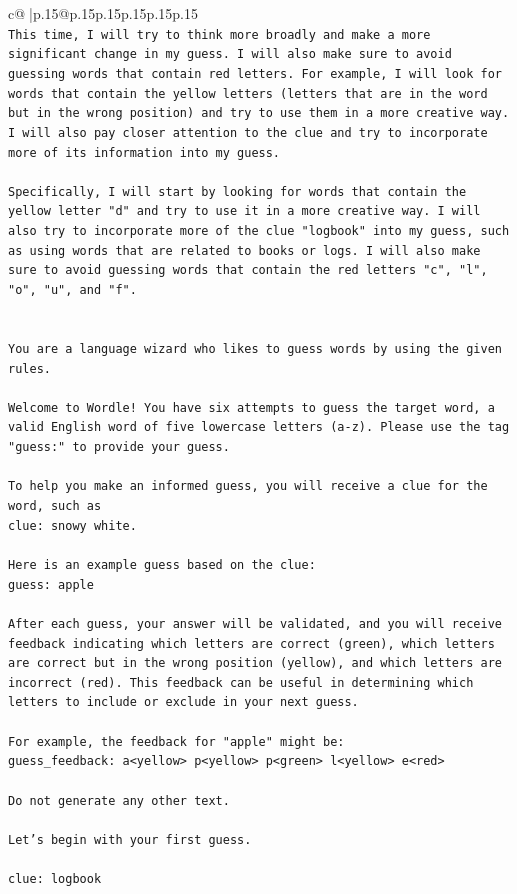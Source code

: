 \documentclass{article}
\begin{document}
{\begin{supertabular}{c@{$\;$}|p{.15\linewidth}@{}p{.15\linewidth}p{.15\linewidth}p{.15\linewidth}p{.15\linewidth}p{.15\linewidth}}
{{{\\ 
\texttt{This time, I will try to think more broadly and make a more significant change in my guess. I will also make sure to avoid guessing words that contain red letters. For example, I will look for words that contain the yellow letters (letters that are in the word but in the wrong position) and try to use them in a more creative way. I will also pay closer attention to the clue and try to incorporate more of its information into my guess.} \\
\\ 
\texttt{Specifically, I will start by looking for words that contain the yellow letter "d" and try to use it in a more creative way. I will also try to incorporate more of the clue "logbook" into my guess, such as using words that are related to books or logs. I will also make sure to avoid guessing words that contain the red letters "c", "l", "o", "u", and "f".} \\
\\ 
\\ 
\texttt{You are a language wizard who likes to guess words by using the given rules.} \\
\\ 
\texttt{Welcome to Wordle! You have six attempts to guess the target word, a valid English word of five lowercase letters (a{-}z). Please use the tag "guess:" to provide your guess.} \\
\\ 
\texttt{To help you make an informed guess, you will receive a clue for the word, such as} \\
\texttt{clue: snowy white.} \\
\\ 
\texttt{Here is an example guess based on the clue: } \\
\texttt{guess: apple} \\
\\ 
\texttt{After each guess, your answer will be validated, and you will receive feedback indicating which letters are correct (green), which letters are correct but in the wrong position (yellow), and which letters are incorrect (red). This feedback can be useful in determining which letters to include or exclude in your next guess.} \\
\\ 
\texttt{For example, the feedback for "apple" might be:} \\
\texttt{guess\_feedback: a<yellow> p<yellow> p<green> l<yellow> e<red>} \\
\\ 
\texttt{Do not generate any other text.} \\
\\ 
\texttt{Let's begin with your first guess.} \\
\\ 
\texttt{clue: logbook} \\
            }
        }
    }
     \\ \\


\end{supertabular}}
\end{document}
